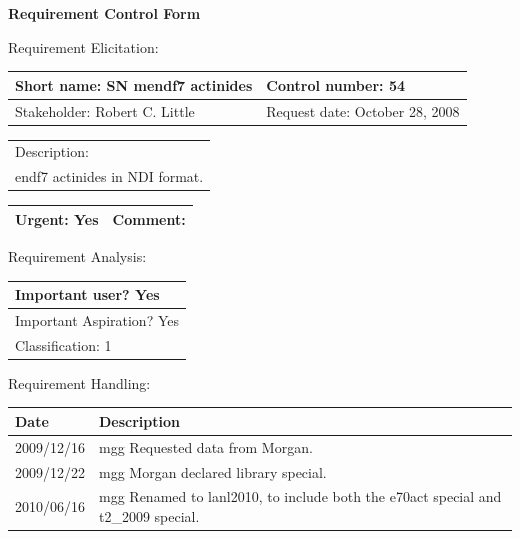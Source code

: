 \begin{center}\Large\bf
Requirement Control Form
\end{center}
\vspace{24pt}

Requirement Elicitation:

\begin{tabular}{|p{211pt}|p{211pt}|} \hline
Short name: SN mendf7 actinides & Control number: 54\\ \hline
Stakeholder: Robert C. Little & Request date: October 28, 2008\\
\end{tabular}
\begin{tabular}{|p{433pt}|} \hline
Description: \\ 
endf7 actinides in NDI format.\\
\hline
\end{tabular} 
\begin{tabular}{|p{211pt}|p{211pt}|} \hline
Urgent: Yes & Comment: \\ \hline
\end{tabular}

\vspace{24pt}

Requirement Analysis:

\begin{tabular}{|p{433pt}|} \hline
Important user? Yes \\ \hline
Important Aspiration? Yes \\ \hline
Classification: 1 \\ \hline
\end{tabular}
\vspace{24pt}

Requirement Handling:

\begin{tabular}{|p{72pt}|p{351pt}|} \hline
Date & Description \\ \hline
2009/12/16 & mgg Requested data from Morgan. \\ \hline
2009/12/22 & mgg Morgan declared library special.\\ \hline
2010/06/16 & mgg Renamed to lanl2010, to include both the e70act
special and t2\_2009 special.
\end{tabular}

